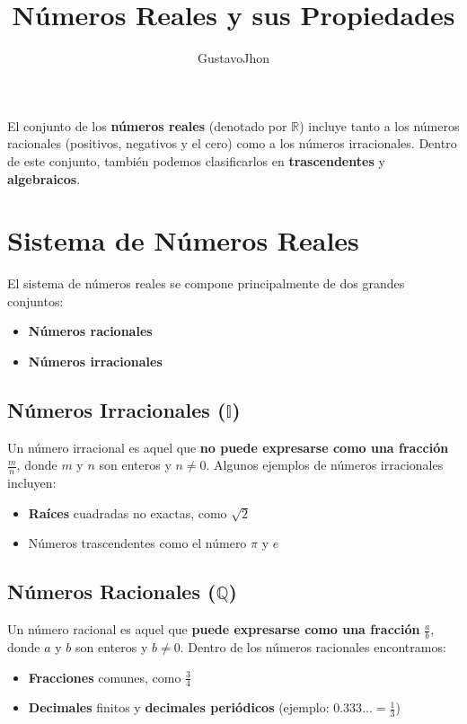 \documentclass{article}
\title{Números Reales y sus Propiedades}
\author{GustavoJhon}
\date{}
\begin{document}
\maketitle

El conjunto de los \textbf{números reales} (denotado por $\mathbb{R}$) incluye tanto a los números racionales (positivos, negativos y el cero) como a los números irracionales. Dentro de este conjunto, también podemos clasificarlos en \textbf{trascendentes} y \textbf{algebraicos}.

\section{Sistema de Números Reales}

El sistema de números reales se compone principalmente de dos grandes conjuntos:

\begin{itemize}
    \item \textbf{Números racionales} 
    \item \textbf{Números irracionales}
\end{itemize}

\subsection{Números Irracionales ($\mathbb{I}$)}

Un número irracional es aquel que \textbf{no puede expresarse como una fracción} $\frac{m}{n}$, donde $m$ y $n$ son enteros y $n \neq 0$. Algunos ejemplos de números irracionales incluyen:

\begin{itemize}
    \item \textbf{Raíces} cuadradas no exactas, como $\sqrt{2}$
    \item Números trascendentes como el número $\pi$ y $e$
\end{itemize}

\subsection{Números Racionales ($\mathbb{Q}$)}

Un número racional es aquel que \textbf{puede expresarse como una fracción} $\frac{a}{b}$, donde $a$ y $b$ son enteros y $b \neq 0$. Dentro de los números racionales encontramos:

\begin{itemize}
    \item \textbf{Fracciones} comunes, como $\frac{3}{4}$
    \item \textbf{Decimales} finitos y \textbf{decimales periódicos} (ejemplo: $0.333\ldots = \frac{1}{3}$)
\end{itemize}
\end{document}
